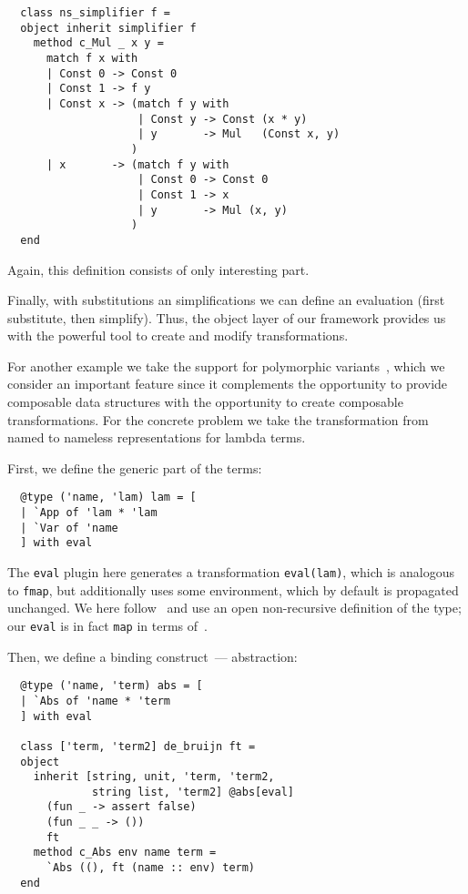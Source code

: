 \documentclass[twocolumn,8pt]{extarticle}
\newcommand{\cd}[1]{\texttt{#1}}
\begin{document}
\begin{lstlisting}
  class ns_simplifier f =
  object inherit simplifier f 
    method c_Mul _ x y =
      match f x with
      | Const 0 -> Const 0
      | Const 1 -> f y
      | Const x -> (match f y with                      
                    | Const y -> Const (x * y)
                    | y       -> Mul   (Const x, y)
                   )
      | x       -> (match f y with
                    | Const 0 -> Const 0
                    | Const 1 -> x
                    | y       -> Mul (x, y)
                   )
  end
\end{lstlisting}

Again, this definition consists of only interesting part.

Finally, with substitutions an simplifications we can define an evaluation (first substitute, then simplify). Thus, the object layer of our framework
provides us with the powerful tool to create and modify transformations.

For another example we take the support for polymorphic variants~\cite{PolyVar,PolyVarReuse}, which we consider an important feature since it complements
the opportunity to provide composable data structures with the opportunity to create composable transformations. For the concrete problem we take the
transformation from named to nameless representations for lambda terms.

First, we define the generic part of the terms:

\begin{lstlisting}
  @type ('name, 'lam) lam = [
  | `App of 'lam * 'lam
  | `Var of 'name
  ] with eval
\end{lstlisting}

The \cd{eval} plugin here generates a transformation \cd{eval(lam)}, which is analogous to \cd{fmap}, but additionally uses some environment, which
by default is propagated unchanged. We here follow~\cite{PolyVarReuse} and use an open non-recursive definition of the type; our \cd{eval} is
in fact \cd{map} in terms of~\cite{Visitors}.

Then, we define a binding construct~--- abstraction:

\begin{lstlisting}
  @type ('name, 'term) abs = [
  | `Abs of 'name * 'term
  ] with eval
  
  class ['term, 'term2] de_bruijn ft =
  object
    inherit [string, unit, 'term, 'term2,
             string list, 'term2] @abs[eval]
      (fun _ -> assert false)
      (fun _ _ -> ())
      ft
    method c_Abs env name term =
      `Abs ((), ft (name :: env) term)
  end
\end{lstlisting}
\end{document}
